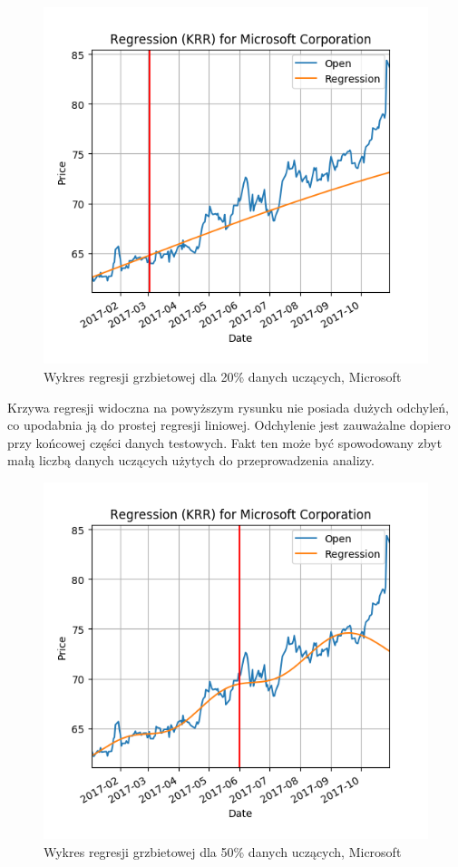 \begin{figure}[h!]
\centering
\includegraphics[width=150mm]{pictures/plots/microsoft_krr_20.png}
\caption{Wykres regresji grzbietowej dla 20\% danych uczących, Microsoft}
\label{fig:microsoft_krr_20}
\end{figure}

Krzywa regresji widoczna na powyższym rysunku nie posiada dużych odchyleń, co upodabnia ją do prostej regresji liniowej.
Odchylenie jest zauważalne dopiero przy końcowej części danych testowych. Fakt ten może być spowodowany zbyt małą liczbą danych uczących użytych do przeprowadzenia analizy.\\

\begin{figure}[h!]
\centering
\includegraphics[width=150mm]{pictures/plots/microsoft_krr_50.png}
\caption{Wykres regresji grzbietowej dla 50\% danych uczących, Microsoft}
\label{fig:microsoft_krr_50}
\end{figure}

